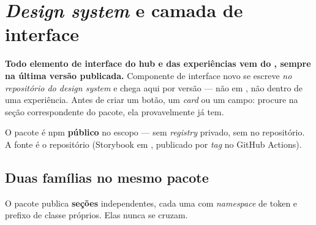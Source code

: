 \chapter{\emph{Design system} e camada de interface}
\label{cap:ds}

\begin{regra}
\textbf{Todo elemento de interface do hub e das experiências vem do
, sempre na última versão publicada.} Componente de
interface novo se escreve \emph{no repositório do \emph{design system}} e chega
aqui por versão --- não em , não dentro de uma experiência.
Antes de criar um botão, um \emph{card} ou um campo: procure na seção
correspondente do pacote, ela provavelmente já tem.
\end{regra}

O pacote é npm \textbf{público} no escopo  --- sem \emph{registry}
privado, sem  no repositório. A fonte é o repositório
 (Storybook em , publicado por \emph{tag}
 no GitHub Actions).

\section{Duas famílias no mesmo pacote}

O pacote publica \textbf{seções} independentes, cada uma com \emph{namespace} de
token e prefixo de classe próprios. Elas nunca se cruzam.

